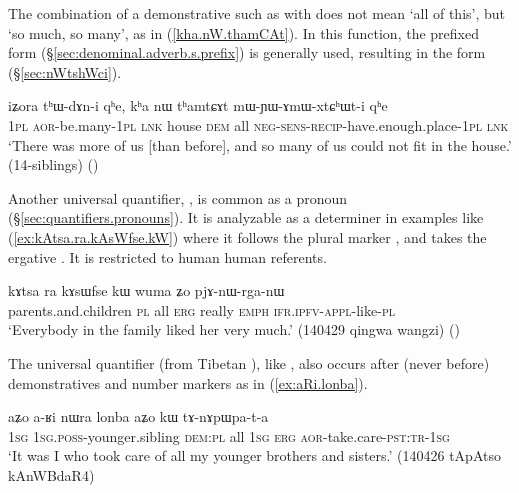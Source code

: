The combination of a demonstrative such as  with   does not mean `all of this', but `so much, so many', as in (\ref{kha.nW.thamCAt}). In this function, the prefixed form  (§\ref{sec:denominal.adverb.s.prefix}) is generally used, resulting in the form  (§\ref{sec:nWtshWci}).

 
\begin{exe}
\ex \label{kha.nW.thamCAt}
 \gll iʑora tʰɯ-dɤn-i qʰe, kʰa nɯ tʰamtɕɤt mɯ-ɲɯ-ɤmɯ-xtɕʰɯt-i qʰe \\ 
 \textsc{1pl} \textsc{aor}-be.many-\textsc{1pl} \textsc{lnk} house \textsc{dem} all \textsc{neg}-\textsc{sens}-\textsc{recip}-have.enough.place-\textsc{1pl} \textsc{lnk} \\
 \glt `There was more of us [than before], and so many of us could not fit in the house.' (14-siblings) ()
 \end{exe}
 
 Another universal quantifier,  , is common as a pronoun (§\ref{sec:quantifiers.pronouns}). It is analyzable as a determiner in examples like  (\ref{ex:kAtsa.ra.kAsWfse.kW}) where it follows the plural marker , and takes the ergative .  It is restricted to human human referents.
 
 \begin{exe}
\ex \label{ex:kAtsa.ra.kAsWfse.kW}
\gll  kɤtsa ra kɤsɯfse kɯ wuma ʑo pjɤ-nɯ-rga-nɯ  \\
parents.and.children \textsc{pl} all \textsc{erg} really \textsc{emph} \textsc{ifr}.\textsc{ipfv}-\textsc{appl}-like-\textsc{pl} \\
\glt `Everybody in the family liked her very much.' (140429 qingwa wangzi) ()
  \end{exe}

The universal quantifier  (from Tibetan ), like , also occurs after (never before) demonstratives and number markers as in (\ref{ex:aRi.lonba}).

 \begin{exe}
\ex \label{ex:aRi.lonba}
 \gll aʑo a-ʁi nɯra lonba aʑo kɯ tɤ-nɤpɯpa-t-a \\
 \textsc{1sg} \textsc{1sg}.\textsc{poss}-younger.sibling \textsc{dem}:\textsc{pl} all \textsc{1sg} \textsc{erg} \textsc{aor}-take.care-\textsc{pst}:\textsc{tr}-\textsc{1sg} \\
 \glt `It was I who took care of all my younger brothers and sisters.' (140426 tApAtso kAnWBdaR4)
\end{exe}
 
